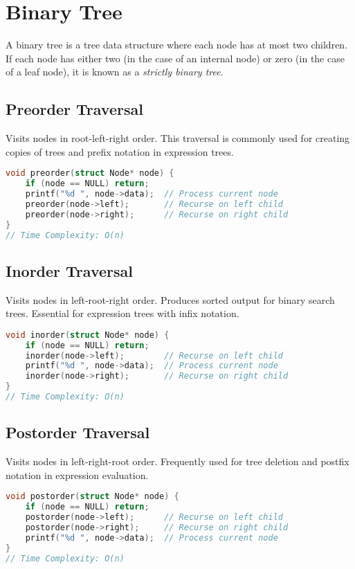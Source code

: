 \section{Binary Tree}

A binary tree is a tree data structure where each node
has at most two children. If each node has either two (in the
case of an internal node) or zero (in the case of a leaf node),
it is known as a \emph{strictly binary tree}.

\subsection{Preorder Traversal}
Visits nodes in root-left-right order. This traversal is commonly used for creating copies of trees and prefix notation in expression trees.

\begin{lstlisting}[language=C, caption=Preorder Traversal Implementation]
void preorder(struct Node* node) {
    if (node == NULL) return;
    printf("%d ", node->data);  // Process current node
    preorder(node->left);       // Recurse on left child
    preorder(node->right);      // Recurse on right child
}
// Time Complexity: O(n)
\end{lstlisting}

\subsection{Inorder Traversal}
Visits nodes in left-root-right order. Produces sorted output for binary search trees. Essential for expression trees with infix notation.

\begin{lstlisting}[language=C, caption=Inorder Traversal Implementation]
void inorder(struct Node* node) {
    if (node == NULL) return;
    inorder(node->left);        // Recurse on left child
    printf("%d ", node->data);  // Process current node
    inorder(node->right);       // Recurse on right child
}
// Time Complexity: O(n)
\end{lstlisting}

\subsection{Postorder Traversal}
Visits nodes in left-right-root order. Frequently used for tree deletion and postfix notation in expression evaluation.

\begin{lstlisting}[language=C, caption=Postorder Traversal Implementation]
void postorder(struct Node* node) {
    if (node == NULL) return;
    postorder(node->left);      // Recurse on left child
    postorder(node->right);     // Recurse on right child
    printf("%d ", node->data);  // Process current node
}
// Time Complexity: O(n)
\end{lstlisting}


